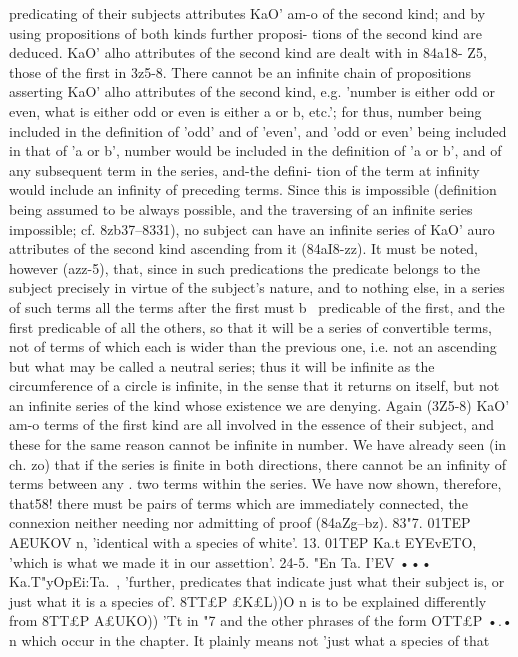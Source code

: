 {{{{{{{{{{{{{{{{{{{{{{{{{{{{{{predicating of their subjects attributes KaO' am-o of the second
kind; and by using propositions of both kinds further proposi-
tions of the second kind are deduced.
KaO' alho attributes of the second kind are dealt with in 84a18-
Z5, those of the first in 3z5-8. There cannot be an infinite chain
of propositions asserting KaO' alho attributes of the second kind,
e.g. 'number is either odd or even, what is either odd or even is
either a or b, etc.'; for thus, number being included in the
definition of 'odd' and of 'even', and 'odd or even' being included
in that of 'a or b', number would be included in the definition of
'a or b', and of any subsequent term in the series, and-the defini-
tion of the term at infinity would include an infinity of preceding
terms. Since this is impossible (definition being assumed to be
always possible, and the traversing of an infinite series impossible;
cf. 8zb37--8331), no subject can have an infinite series of KaO' auro
attributes of the second kind ascending from it (84aI8-zz). It
must be noted, however (azz-5), that, since in such predications
the predicate belongs to the subject precisely in virtue of the
subject's nature, and to nothing else, in a series of such terms all
the terms after the first must b~ predicable of the first, and the
first predicable of all the others, so that it will be a series of
convertible terms, not of terms of which each is wider than the
previous one, i.e. not an ascending but what may be called a
neutral series; thus it will be infinite as the circumference of a
circle is infinite, in the sense that it returns on itself, but not an
infinite series of the kind whose existence we are denying.
Again (3Z5-8) KaO' am-o terms of the first kind are all involved
in the essence of their subject, and these for the same reason
cannot be infinite in number.
We have already seen (in ch. zo) that if the series is finite in
both directions, there cannot be an infinity of terms between any .
two terms within the series. We have now shown, therefore, that58!
there must be pairs of terms which are immediately connected,
the connexion neither needing nor admitting of proof (84aZg--bz).
83"7. 01TEP AEUKOV n, 'identical with a species of white'.
13. 01TEP Ka.t EYEvETO, 'which is what we made it in our assettion'.
24-5. "En Ta. I'EV ••• Ka.T"yOpEi:Ta.~, 'further, predicates that
indicate just what their subject is, or just what it is a species of'.
8TT£P £K£L))O n is to be explained differently from 8TT£P A£UKO)) 'Tt
in "7 and the other phrases of the form OTT£P •.• n which occur in
the chapter. It plainly means not 'just what a species of that
}}}}}}}}}}}}}}}}}}}}}}}}}}}}}}
